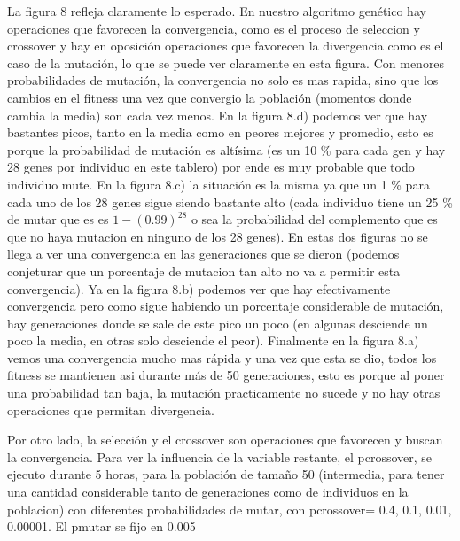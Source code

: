 \documentclass[A4paper,oneside,fleqn,11pt]{article}
\theoremstyle{definition}
\begin{document}
La figura 8 refleja claramente lo esperado. En nuestro algoritmo genético hay operaciones que favorecen la convergencia, como es el proceso de seleccion y crossover y hay en oposición operaciones que favorecen la divergencia como es el caso de la mutación, lo que se puede ver claramente en esta figura. Con menores probabilidades de mutación, la convergencia no solo es mas rapida, sino que los cambios en el fitness una vez que convergio la población (momentos donde cambia la media) son cada vez menos. En la figura 8.d) podemos ver que hay bastantes picos, tanto en la media como en peores mejores y promedio, esto es porque la probabilidad de mutación es altísima (es un 10 \% para cada gen y hay 28 genes por individuo en este tablero) por ende es muy probable que todo individuo mute. En la figura 8.c) la situación es la misma ya que un 1 \% para cada uno de los 28 genes sigue siendo bastante alto (cada individuo tiene un 25 \% de mutar que es es $1- (0.99)^28$ o sea la probabilidad del complemento que es que no haya mutacion en ninguno de los 28 genes). En estas dos figuras no se llega a ver una convergencia en las generaciones que se dieron (podemos conjeturar que un porcentaje de mutacion tan alto no va a permitir esta convergencia). Ya en la figura 8.b) podemos ver que hay  efectivamente convergencia pero como sigue habiendo un porcentaje considerable de mutación, hay generaciones donde se sale de este pico un poco (en algunas desciende un poco la media, en otras solo desciende el peor). Finalmente en la figura 8.a) vemos una convergencia mucho mas rápida y una vez que esta se dio, todos los fitness se mantienen asi durante más de 50 generaciones, esto es porque al poner una probabilidad tan baja, la mutación practicamente no sucede y no hay otras operaciones que permitan divergencia.

Por otro lado, la selección y el crossover son operaciones que favorecen y buscan la convergencia. Para ver la influencia de la variable restante, el pcrossover, se ejecuto durante 5 horas,  para la población de tamaño 50 (intermedia, para tener una cantidad considerable tanto de generaciones como de individuos en la poblacion) con diferentes probabilidades de mutar, con pcrossover= 0.4, 0.1, 0.01, 0.00001.  El pmutar se fijo en 0.005
\end{document}
